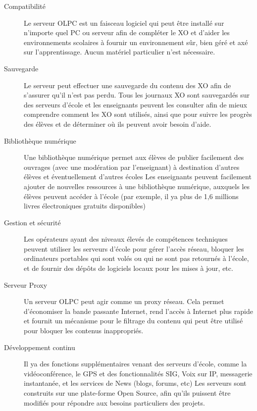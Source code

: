 \documentclass[11pt]{article}
\begin{document}
\begin{description}
\item[Compatibilité] Le serveur OLPC est un faisceau logiciel qui peut être
                   installé sur n'importe quel PC ou serveur afin de
                   compléter le XO et d'aider les environnements scolaires
                   à fournir un environnement sûr, bien géré et axé sur
                   l'apprentissage. Aucun matériel particulier n'est
                   nécessaire.
\item[Sauvegarde] Le serveur peut effectuer une sauvegarde du contenu des XO
                afin de s'assurer qu'il n'est pas perdu. Tous les journaux
                XO sont sauvegardés sur des serveurs d'école et les
                enseignants peuvent les consulter afin de mieux comprendre
                comment les XO sont utilisés, ainsi que pour suivre les
                progrès des élèves et de déterminer où ils peuvent avoir
                besoin d'aide.
\item[Bibliothèque numérique] Une bibliothèque numérique permet aux élèves de
     publier facilement des ouvrages (avec une modération par l'enseignant)
     à destination d'autres élèves et éventuellement d'autres écoles Les
     enseignants peuvent facilement ajouter de nouvelles ressources à une
     bibliothèque numérique, auxquels les élèves peuvent accéder à l'école
     (par exemple, il ya plus de 1,6 millions livres électroniques gratuits
     disponibles)
\item[Gestion et sécurité] Les opérateurs ayant des niveaux élevés de
     compétences techniques peuvent utiliser les serveurs d'école pour
     gérer l'accès réseau, bloquer les ordinateurs portables qui sont volés
     ou qui ne sont pas retournés à l'école, et de fournir des dépôts de
     logiciels locaux pour les mises à jour, etc.
\item[Serveur Proxy] Un serveur OLPC peut agir comme un proxy réseau. Cela
                   permet d'économiser la bande passante Internet, rend
                   l'accès à Internet plus rapide et fournit un mécanisme
                   pour le filtrage du contenu qui peut être utilisé pour
                   bloquer les contenus inappropriés.
\item[Développement continu] Il ya des fonctions supplémentaires venant des
     serveurs d'école, comme la vidéoconférence, le GPS et des
     fonctionnalités SIG, Voix sur IP, messagerie instantanée, et les
     services de News (blogs, forums, etc) Les serveurs sont construits sur
     une plate-forme Open Source, afin qu'ils puissent être modifiés pour
     répondre aux besoins particuliers des projets.
\end{description}
\end{document}
